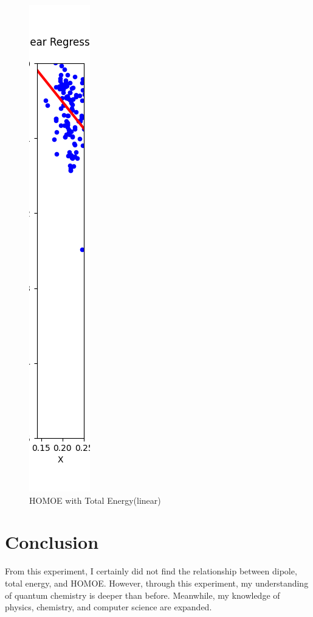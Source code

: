 \documentclass{article}
\begin{document}
\begin{figure}[H]
\centering
\includegraphics[scale=0.5]{lin_regression.png}
\caption{HOMOE with Total Energy(linear)}
\label{fig:HOMOE with Total Energy}
\end{figure}


\section{Conclusion}
From this experiment, I certainly did not find the relationship between dipole, total energy, and HOMOE. However, through this experiment, my understanding of quantum chemistry is deeper than before. Meanwhile, my knowledge of physics, chemistry, and computer science are expanded.



\end{document}
